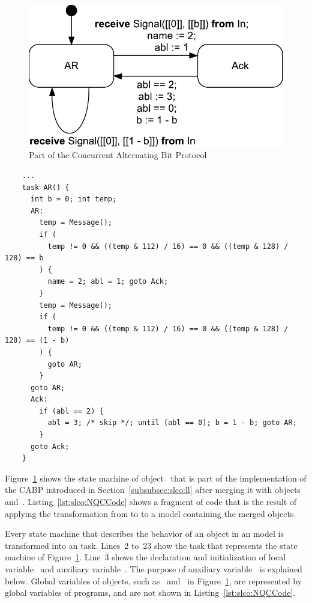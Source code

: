 \begin{figure}[hbt]
  \centering
  \includegraphics[scale=0.45]{slco/figs/slco2nqc/SimplifiedAR}
  \caption{Part of the Concurrent Alternating Bit Protocol}
  \label{fig:slco:CABP}
\end{figure}

\begin{listing}
  \lstset{
    language=nqc,
    label=lst:slco:NQCCode,
    caption=Fragment of \NQC code,
    numbers=left
  }
  \begin{lstlisting}
    ...
    task AR() {
      int b = 0; int temp;
      AR:
        temp = Message();
        if (
          temp != 0 && ((temp & 112) / 16) == 0 && ((temp & 128) / 128) == b
        ) {
          name = 2; abl = 1; goto Ack;
        }
        temp = Message();
        if (
          temp != 0 && ((temp & 112) / 16) == 0 && ((temp & 128) / 128) == (1 - b)
        ) {
          goto AR;
        }
      goto AR;
      Ack:
        if (abl == 2) {
          abl = 3; /* skip */; until (abl == 0); b = 1 - b; goto AR;
        }
      goto Ack;
    }
  \end{lstlisting}
\end{listing}

Figure~\ref{fig:slco:CABP} shows the state machine of object~ that is part of the implementation of the CABP introduced in Section~\ref{subsubsec:slco:ll} after merging it with objects~ and~.
Listing~\ref{lst:slco:NQCCode} shows a fragment of \NQC code that is the result of applying the transformation from \SLCO to \NQC to a model containing the merged objects.

Every state machine that describes the behavior of an object in an \SLCO model is transformed into an \NQC task.
Lines~2 to~23 show the task that represents the state machine of Figure~\ref{fig:slco:CABP}.
Line~3 shows the declaration and initialization of local variable~ and auxiliary variable~.
The purpose of auxiliary variable~ is explained below.
Global variables of \SLCO objects, such as~ and~ in Figure~\ref{fig:slco:CABP}, are represented by global variables of \NQC programs, and are not shown in Listing~\ref{lst:slco:NQCCode}.


